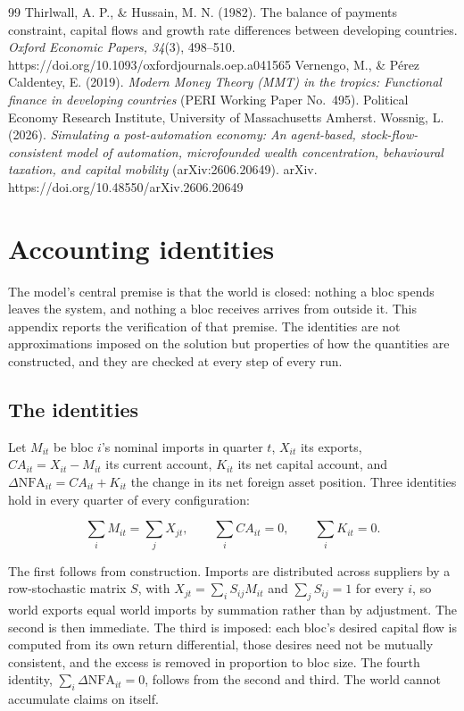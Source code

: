 \documentclass[preprint,review,12pt]{elsarticle}
\begin{document}
\begin{thebibliography}{99}
 Thirlwall, A. P., \& Hussain, M. N. (1982). The balance of payments constraint, capital flows and growth rate differences between developing countries. \emph{Oxford Economic Papers, 34}(3), 498--510. https://doi.org/10.1093/oxfordjournals.oep.a041565 
 Vernengo, M., \& Pérez Caldentey, E. (2019). \emph{Modern Money Theory (MMT) in the tropics: Functional finance in developing countries} (PERI Working Paper No.~495). Political Economy Research Institute, University of Massachusetts Amherst. 
 Wossnig, L. (2026). \emph{Simulating a post-automation economy: An agent-based, stock-flow-consistent model of automation, microfounded wealth concentration, behavioural taxation, and capital mobility} (arXiv:2606.20649). arXiv. https://doi.org/10.48550/arXiv.2606.20649 
\end{thebibliography} 
\clearpage
\appendix

\section{Accounting identities}

The model's central premise is that the world is closed: nothing a bloc spends
leaves the system, and nothing a bloc receives arrives from outside it. This
appendix reports the verification of that premise. The identities are not
approximations imposed on the solution but properties of how the quantities
are constructed, and they are checked at every step of every run.

\subsection{The identities}

Let $M_{it}$ be bloc $i$'s nominal imports in quarter $t$, $X_{it}$ its
exports, $CA_{it} = X_{it} - M_{it}$ its current account, $K_{it}$ its net
capital account, and $\Delta \mathrm{NFA}_{it} = CA_{it} + K_{it}$ the change
in its net foreign asset position. Three identities hold in every quarter of
every configuration:

\[\sum_i M_{it} = \sum_j X_{jt}, \qquad \sum_i CA_{it} = 0, \qquad \sum_i K_{it} = 0. \tag{A.1}\]

The first follows from construction. Imports are distributed across suppliers
by a row-stochastic matrix $S$, with $X_{jt} = \sum_i S_{ij} M_{it}$ and
$\sum_j S_{ij} = 1$ for every $i$, so world exports equal world imports by
summation rather than by adjustment. The second is then immediate. The third
is imposed: each bloc's desired capital flow is computed from its own return
differential, those desires need not be mutually consistent, and the excess is
removed in proportion to bloc size. The fourth identity,
$\sum_i \Delta \mathrm{NFA}_{it} = 0$, follows from the second and third. The
world cannot accumulate claims on itself.
\end{document}
